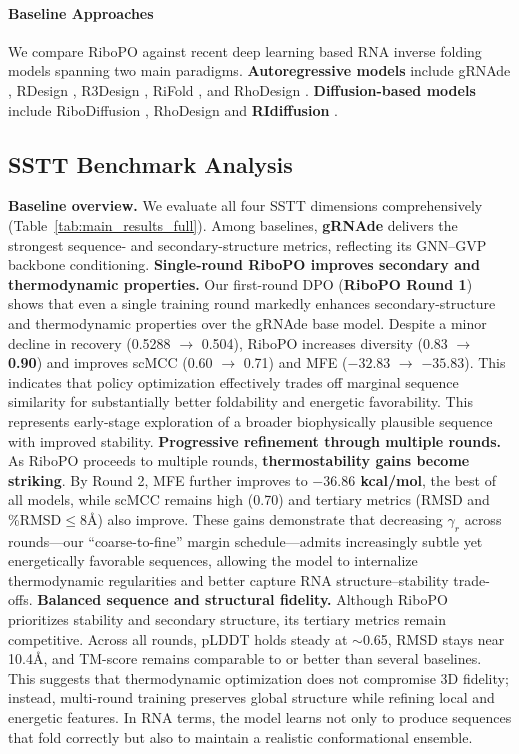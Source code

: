 \paragraph{Baseline Approaches}
We compare RiboPO against recent deep learning based RNA inverse folding models spanning two main paradigms. 
\textbf{Autoregressive models} include gRNAde \citep{joshi2025grnade}, RDesign \citep{tanrdesign}, R3Design \citep{tan2025r3design}, RiFold \citep{liu2025sentences}, and RhoDesign \citep{wong2024deep}.
\textbf{Diffusion-based models} include RiboDiffusion \citep{huang2024ribodiffusion}, RhoDesign \citep{wong2024deep} and \textbf{RIdiffusion} \citep{Hou2025ridiffusion}.



\subsection{SSTT Benchmark Analysis}
\label{subsec:benchmark_analysis}

\textbf{Baseline overview.}
We evaluate all four SSTT dimensions comprehensively (Table~\ref{tab:main_results_full}). Among baselines, \textbf{gRNAde} delivers the strongest sequence- and secondary-structure metrics, reflecting its GNN–GVP backbone conditioning. \textbf{Single-round RiboPO improves secondary and thermodynamic properties.}
Our first-round DPO (\textbf{RiboPO Round 1}) shows that even a single training round markedly enhances secondary-structure and thermodynamic properties over the gRNAde base model. Despite a minor decline in recovery (0.5288 $\rightarrow$ 0.504), RiboPO increases diversity (0.83 $\rightarrow$ \textbf{0.90}) and improves scMCC (0.60 $\rightarrow$ 0.71) and MFE ($-32.83$ $\rightarrow$ \textbf{$-35.83$}). This indicates that policy optimization effectively trades off marginal sequence similarity for substantially better foldability and energetic favorability. This represents early-stage exploration of a broader biophysically plausible sequence with improved stability. \textbf{Progressive refinement through multiple rounds.}
As RiboPO proceeds to multiple rounds, \textbf{thermostability gains become striking}. By Round 2, MFE further improves to \textbf{$-36.86$ kcal/mol}, the best of all models, while scMCC remains high (0.70) and tertiary metrics (RMSD and \%RMSD$\leq$8Å) also improve. These gains demonstrate that decreasing $\gamma_r$ across rounds—our “coarse-to-fine” margin schedule—admits increasingly subtle yet energetically favorable sequences, allowing the model to internalize thermodynamic regularities and better capture RNA structure–stability trade-offs. \textbf{Balanced sequence and structural fidelity.}
Although RiboPO prioritizes stability and secondary structure, its tertiary metrics remain competitive. Across all rounds, pLDDT holds steady at $\sim$0.65, RMSD stays near 10.4Å, and TM-score remains comparable to or better than several baselines. This suggests that thermodynamic optimization does not compromise 3D fidelity; instead, multi-round training preserves global structure while refining local and energetic features. In RNA terms, the model learns not only to produce sequences that fold correctly but also to maintain a realistic conformational ensemble.

